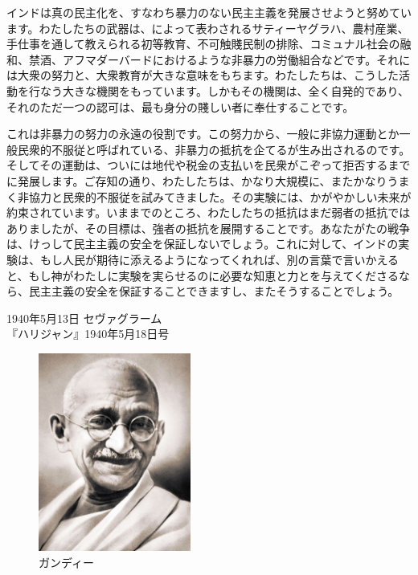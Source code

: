 インドは真の民主化を、すなわち暴力のない民主主義を発展させようと努めています。わたしたちの武器は、によって表わされるサティーヤグラハ、農村産業、手仕事を通して教えられる初等教育、不可触賤民制の排除、コミュナル社会の融和、禁酒、アフマダーバードにおけるような非暴力の労働組合などです。それには大衆の努力と、大衆教育が大きな意味をもちます。わたしたちは、こうした活動を行なう大きな機関をもっています。しかもその機関は、全く自発的であり、それのただ一つの認可は、最も身分の賤しい者に奉仕することです。

これは非暴力の努力の永遠の役割です。この努力から、一般に非協力運動とか一般民衆的不服従と呼ばれている、非暴力の抵抗を企てるが生み出されるのです。そしてその運動は、ついには地代や税金の支払いを民衆がこぞって拒否するまでに発展します。ご存知の通り、わたしたちは、かなり大規模に、またかなりうまく非協力と民衆的不服従を試みてきました。その実験には、かがやかしい未来が約束されています。いままでのところ、わたしたちの抵抗はまだ弱者の抵抗ではありましたが、その目標は、強者の抵抗を展開することです。あなたがたの戦争は、けっして民主主義の安全を保証しないでしょう。これに対して、インドの実験は、もし人民が期待に添えるようになってくれれば、別の言葉で言いかえると、もし神がわたしに実験を実らせるのに必要な知恵と力とを与えてくださるなら、民主主義の安全を保証することできますし、またそうすることでしょう。
\begin{flushright}
  1940年5月13日 セヴァグラーム \\
『ハリジャン』1940年5月18日号
\end{flushright}


  \begin{figure}[htbp]
    \centering
      \includegraphics[width=50mm]{images/gandhi.jpg}
    \caption{ガンディー}
  \end{figure}



\newpage{}

